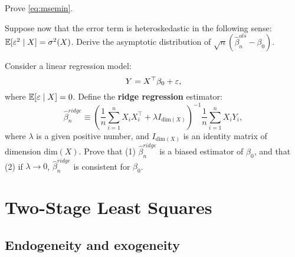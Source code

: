 \documentclass[11pt, A4paper, openany, uplatex]{book}
\begin{document}
\begin{framed}
\begin{exercise}\upshape
	Prove \eqref{eq:msemin}.
\end{exercise}
\begin{exercise}\upshape
	Suppose now that the error term is heteroskedastic in the following sense: $\mathbb{E}[\varepsilon^2 \mid X] = \sigma^2(X)$.
	Derive the asymptotic distribution of $\sqrt{n}(\hat \beta_n^{ols} - \beta_0)$.
\end{exercise}
\begin{exercise}\upshape
	Consider a linear regression model:
	\[
	Y = X^\top \beta_0 + \varepsilon,
	\]
	where $\mathbb{E}[\varepsilon \mid X] = 0$.
	Define the \textbf{ridge regression} estimator:
	\[
	\hat \beta_n^{ridge} \equiv \left(\frac{1}{n}\sum_{i = 1}^n X_i X_i^\top + \lambda I_{\text{dim}(X)} \right)^{-1}\frac{1}{n}\sum_{i = 1}^n X_i Y_i,
	\]
	where $\lambda$ is a given positive number, and $I_{\text{dim}(X)}$ is an identity matrix of dimension $\text{dim}(X)$.
	Prove that (1) $\hat \beta_n^{ridge}$ is a biased estimator of $\beta_0$, and that (2) if $\lambda \to 0$, $\hat \beta_n^{ridge}$ is consistent for $\beta_0$.
\end{exercise}
\end{framed}


\chapter{Two-Stage Least Squares}\label{chap:2sls}
\section{Endogeneity and exogeneity}
\end{document}
